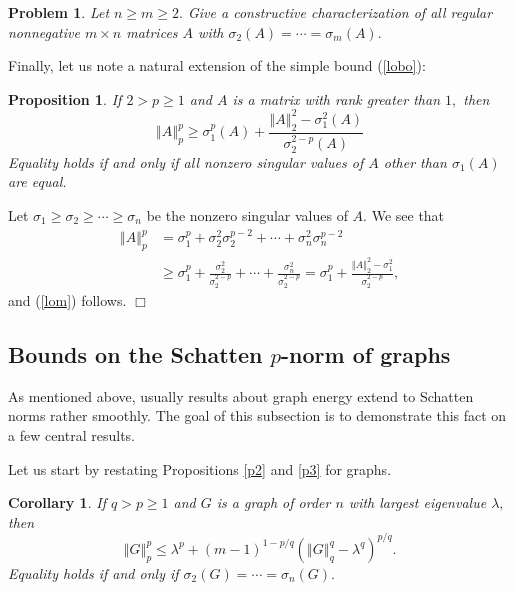 \documentclass[12pt]{article}%
\newtheorem{corollary}[theorem]{Corollary}
\newtheorem{problem}[theorem]{Problem}
\newtheorem{proposition}[theorem]{Proposition}
\newenvironment{proof}[1][Proof]{\noindent{\textbf {#1}  }}  {\hfill$\Box$\bigskip}
\begin{document}
\begin{problem}
\label{prob}Let $n\geq m\geq2.$ Give a constructive characterization of all
regular nonnegative $m\times n$ matrices $A$ with $\sigma_{2}\left(  A\right)
=\cdots=\sigma_{m}\left(  A\right)  .$
\end{problem}

Finally, let us note a natural extension of the simple bound (\ref{lobo}):

\begin{proposition}
If $2>p\geq1$ and $A$ is a matrix with rank greater than $1,$ then%
\begin{equation}
\left\Vert A\right\Vert _{p}^{p}\geq\sigma_{1}^{p}\left(  A\right)
+\frac{\left\Vert A\right\Vert _{2}^{2}-\sigma_{1}^{2}\left(  A\right)
}{\sigma_{2}^{2-p}\left(  A\right)  } \label{lom}%
\end{equation}
Equality holds if and only if all nonzero singular values of $A$ other than
$\sigma_{1}\left(  A\right)  $ are equal.
\end{proposition}

\begin{proof}
Let $\sigma_{1}\geq\sigma_{2}\geq\cdots\geq\sigma_{n}$ be the nonzero singular
values of $A.$ We see that
\begin{align*}
\left\Vert A\right\Vert _{p}^{p}  &  =\sigma_{1}^{p}+\sigma_{2}^{2}\sigma
_{2}^{p-2}+\cdots+\sigma_{n}^{2}\sigma_{n}^{p-2}\\
&  \geq\sigma_{1}^{p}+\frac{\sigma_{2}^{2}}{\sigma_{2}^{2-p}}+\cdots
+\frac{\sigma_{n}^{2}}{\sigma_{2}^{2-p}}=\sigma_{1}^{p}+\frac{\left\Vert
A\right\Vert _{2}^{2}-\sigma_{1}^{2}}{\sigma_{2}^{2-p}},
\end{align*}
and (\ref{lom}) follows.
\end{proof}

\subsection{\label{SSg}Bounds on the Schatten $p$-norm of graphs}

As mentioned above, usually results about graph energy extend to Schatten
norms rather smoothly. The goal of this subsection is to demonstrate this fact
on a few central results.

Let us start by restating Propositions \ref{p2} and \ref{p3} for graphs.

\begin{corollary}
\label{p2g}If $q>p\geq1$ and $G$ is a graph of order $n$ with largest
eigenvalue $\lambda,$ then
\[
\left\Vert G\right\Vert _{p}^{p}\leq\lambda^{p}+\left(  m-1\right)
^{1-p/q}\left(  \left\Vert G\right\Vert _{q}^{q}-\lambda^{q}\right)  ^{p/q}.
\]
Equality holds if and only if $\sigma_{2}\left(  G\right)  =\cdots=\sigma
_{n}\left(  G\right)  .$
\end{corollary}
\end{document}
